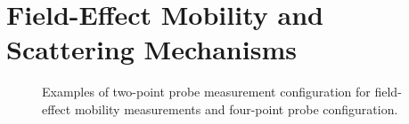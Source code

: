 \section{Field-Effect Mobility and Scattering Mechanisms}\label{sec:mufe_scatter}
\begin{figure}[ht]
	\centering
	\qquad
	\caption[Field-effect mobility measurement configuration]{Examples of \protect{} two-point probe measurement configuration for field-effect mobility measurements and \protect{} four-point probe configuration.}
\end{figure}

